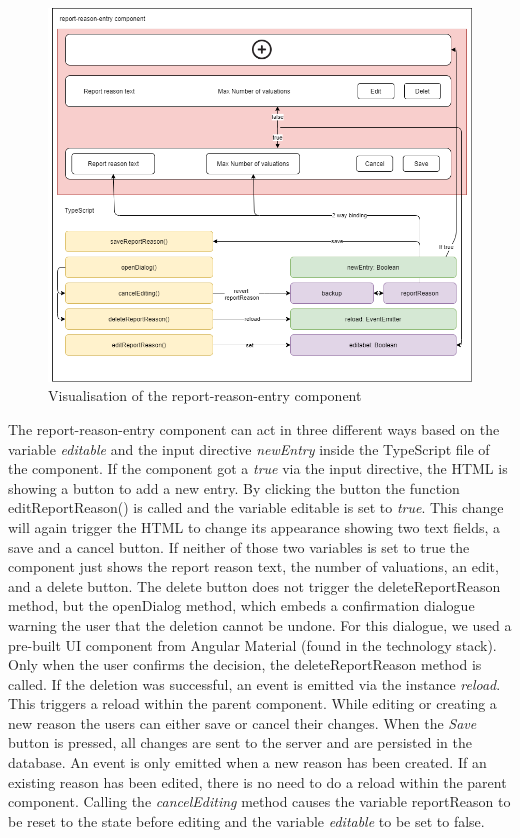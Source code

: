 \begin{figure}[h]
    \centering
    \includegraphics[width=1.0\textwidth]{./images/report_reason_entry_3}
    \caption{Visualisation of the report-reason-entry component}
    \label{fig:reportreasonent}
\end{figure}
\vspace{5mm}

The report-reason-entry component can act in three different ways based on the variable \textit{editable} and the input
directive \textit{newEntry} inside the TypeScript file of the component.
If the component got a \textit{true} via the input directive, the HTML is showing a button to add a new entry.
By clicking the button the function editReportReason() is called and the variable editable is set to \textit{true}.
This change will again trigger the HTML to change its appearance showing two text fields, a save and a cancel button.
If neither of those two variables is set to true the component just shows the report reason text, the number of
valuations, an edit, and a delete button.
The delete button does not trigger the deleteReportReason method, but the openDialog method, which embeds a confirmation
dialogue warning the user that the deletion cannot be undone.
For this dialogue, we used a pre-built UI component from Angular Material (found in the technology stack).
Only when the user confirms the decision, the deleteReportReason method is called.
If the deletion was successful, an event is emitted via the instance \textit{reload}.
This triggers a reload within the parent component.
While editing or creating a new reason the users can either save or cancel their changes.
When the \textit{Save} button is pressed, all changes are sent to the server and are persisted in the database.
An event is only emitted when a new reason has been created.
If an existing reason has been edited, there is no need to do a reload within the parent component.
Calling the \textit{cancelEditing} method causes the variable reportReason to be reset to the state before editing and
the variable \textit{editable} to be set to false.

